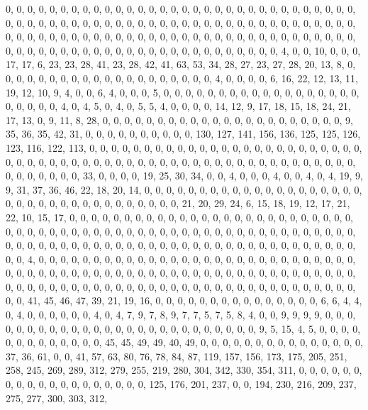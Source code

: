 \documentclass[
]{article}
\begin{document}
0, 0, 0, 0, 0, 0, 0, 0, 0, 0, 0, 0, 0, 0, 0, 0, 0, 0, 0, 0, 0, 0, 0, 0,
0, 0, 0, 0, 0, 0, 0, 0, 0, 0, 0, 0, 0, 0, 0, 0, 0, 0, 0, 0, 0, 0, 0, 0,
0, 0, 0, 0, 0, 0, 0, 0, 0, 0, 0, 0, 0, 0, 0, 0, 0, 0, 0, 0, 0, 0, 0, 0,
0, 0, 0, 0, 0, 0, 0, 0, 0, 0, 0, 0, 0, 0, 0, 0, 0, 0, 0, 0, 0, 0, 0, 0,
0, 0, 0, 0, 0, 0, 0, 0, 0, 0, 0, 0, 0, 0, 0, 0, 0, 0, 0, 0, 0, 0, 0, 0,
0, 4, 0, 0, 10, 0, 0, 0, 17, 17, 6, 23, 23, 28, 41, 23, 28, 42, 41, 63,
53, 34, 28, 27, 23, 27, 28, 20, 13, 8, 0, 0, 0, 0, 0, 0, 0, 0, 0, 0, 0,
0, 0, 0, 0, 0, 0, 0, 0, 0, 4, 0, 0, 0, 0, 6, 16, 22, 12, 13, 11, 19, 12,
10, 9, 4, 0, 0, 6, 4, 0, 0, 0, 5, 0, 0, 0, 0, 0, 0, 0, 0, 0, 0, 0, 0, 0,
0, 0, 0, 0, 0, 0, 0, 0, 0, 0, 4, 0, 4, 5, 0, 4, 0, 5, 5, 4, 0, 0, 0, 0,
14, 12, 9, 17, 18, 15, 18, 24, 21, 17, 13, 0, 9, 11, 8, 28, 0, 0, 0, 0,
0, 0, 0, 0, 0, 0, 0, 0, 0, 0, 0, 0, 0, 0, 0, 0, 0, 0, 9, 35, 36, 35, 42,
31, 0, 0, 0, 0, 0, 0, 0, 0, 0, 0, 130, 127, 141, 156, 136, 125, 125,
126, 123, 116, 122, 113, 0, 0, 0, 0, 0, 0, 0, 0, 0, 0, 0, 0, 0, 0, 0, 0,
0, 0, 0, 0, 0, 0, 0, 0, 0, 0, 0, 0, 0, 0, 0, 0, 0, 0, 0, 0, 0, 0, 0, 0,
0, 0, 0, 0, 0, 0, 0, 0, 0, 0, 0, 0, 0, 0, 0, 0, 0, 0, 0, 0, 0, 0, 0, 0,
33, 0, 0, 0, 0, 19, 25, 30, 34, 0, 0, 4, 0, 0, 0, 4, 0, 0, 4, 0, 4, 19,
9, 9, 31, 37, 36, 46, 22, 18, 20, 14, 0, 0, 0, 0, 0, 0, 0, 0, 0, 0, 0,
0, 0, 0, 0, 0, 0, 0, 0, 0, 0, 0, 0, 0, 0, 0, 0, 0, 0, 0, 0, 0, 0, 0, 0,
0, 21, 20, 29, 24, 6, 15, 18, 19, 12, 17, 21, 22, 10, 15, 17, 0, 0, 0,
0, 0, 0, 0, 0, 0, 0, 0, 0, 0, 0, 0, 0, 0, 0, 0, 0, 0, 0, 0, 0, 0, 0, 0,
0, 0, 0, 0, 0, 0, 0, 0, 0, 0, 0, 0, 0, 0, 0, 0, 0, 0, 0, 0, 0, 0, 0, 0,
0, 0, 0, 0, 0, 0, 0, 0, 0, 0, 0, 0, 0, 0, 0, 0, 0, 0, 0, 0, 0, 0, 0, 0,
0, 0, 0, 0, 0, 0, 0, 0, 0, 0, 0, 0, 0, 0, 0, 0, 0, 4, 0, 0, 0, 0, 0, 0,
0, 0, 0, 0, 0, 0, 0, 0, 0, 0, 0, 0, 0, 0, 0, 0, 0, 0, 0, 0, 0, 0, 0, 0,
0, 0, 0, 0, 0, 0, 0, 0, 0, 0, 0, 0, 0, 0, 0, 0, 0, 0, 0, 0, 0, 0, 0, 0,
0, 0, 0, 0, 0, 0, 0, 0, 0, 0, 0, 0, 0, 0, 0, 0, 0, 0, 0, 0, 0, 0, 0, 0,
0, 0, 0, 0, 0, 0, 0, 0, 0, 0, 0, 0, 0, 0, 0, 0, 0, 41, 45, 46, 47, 39,
21, 19, 16, 0, 0, 0, 0, 0, 0, 0, 0, 0, 0, 0, 0, 0, 0, 0, 6, 6, 4, 4, 0,
4, 0, 0, 0, 0, 0, 0, 4, 0, 4, 7, 9, 7, 8, 9, 7, 7, 5, 7, 5, 8, 4, 0, 0,
9, 9, 9, 9, 0, 0, 0, 0, 0, 0, 0, 0, 0, 0, 0, 0, 0, 0, 0, 0, 0, 0, 0, 0,
0, 0, 0, 0, 0, 0, 9, 5, 15, 4, 5, 0, 0, 0, 0, 0, 0, 0, 0, 0, 0, 0, 0, 0,
45, 45, 49, 49, 40, 49, 0, 0, 0, 0, 0, 0, 0, 0, 0, 0, 0, 0, 0, 0, 0, 37,
36, 61, 0, 0, 41, 57, 63, 80, 76, 78, 84, 87, 119, 157, 156, 173, 175,
205, 251, 258, 245, 269, 289, 312, 279, 255, 219, 280, 304, 342, 330,
354, 311, 0, 0, 0, 0, 0, 0, 0, 0, 0, 0, 0, 0, 0, 0, 0, 0, 0, 0, 0, 125,
176, 201, 237, 0, 0, 194, 230, 216, 209, 237, 275, 277, 300, 303, 312,
\end{document}
